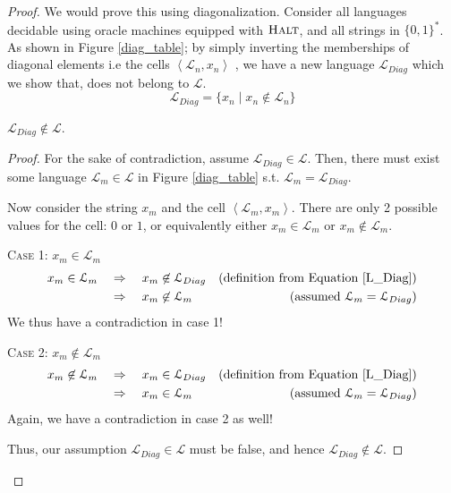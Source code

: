\documentclass[usletter]{article}
\newcommand {\langset}[1]      {\ensuremath{\mathcal{#1}}}
\newcommand {\namedlangset}[1] {\ensuremath{\textnormal{\textsc{#1}}}}
\newcommand {\langL}          {\langset{L}}
\begin{document}
\begin{enumerate}
\begin{proof}
    We would prove this using diagonalization. Consider all languages decidable
    using oracle machines equipped with \namedlangset{Halt}, and all strings in
    $\{0,1\}^*$. As shown in Figure \ref{diag_table}; by simply inverting the
    memberships of diagonal elements i.e the cells $\left< \langL_n,x_n \right>$
    , we have a new language $\langL_{Diag}$ which we show that, does not belong
    to \langL.
    \begin{equation}
      \label{L_Diag}
      \langL_{Diag} = \{ x_n \mid x_n \not\in \langL_n \}
    \end{equation}
    \begin{claim}
      $ \langL_{Diag} \not\in \langL $.
    \end{claim}
    \begin{proof}
      For the sake of contradiction, assume $\langL_{Diag} \in \langL$. Then,
      there must exist some language $\langL_m \in \langL$ in Figure
      \ref{diag_table} s.t. $\langL_m = \langL_{Diag}$.

      Now consider the string $x_m$ and the cell $\left< \langL_m, x_m \right>$.
      There are only 2 possible values for the cell: $0$ or $1$, or equivalently
      either $x_m \in \langL_m$ or $x_m \not\in \langL_m$.

      \textsc{Case 1: $x_m \in \langL_m$}
      \begin{align*}
        x_m \in \langL_m \quad &\Rightarrow \quad x_m \not\in \langL_{Diag}
            & (\textnormal{definition from Equation }\ref{L_Diag})\\
          &\Rightarrow \quad x_m \not\in \langL_m
            & (\textnormal{assumed }\langL_m = \langL_{Diag})
      \end{align*}
      We thus have a contradiction in case 1!

      \textsc{Case 2: $x_m \not\in \langL_m$}
      \begin{align*}
        x_m \not\in \langL_m \quad &\Rightarrow \quad x_m \in \langL_{Diag}
            & (\textnormal{definition from Equation }\ref{L_Diag})\\
          &\Rightarrow \quad x_m \in \langL_m
            & (\textnormal{assumed }\langL_m = \langL_{Diag})
      \end{align*}
      Again, we have a contradiction in case 2 as well!

      Thus, our assumption  $\langL_{Diag} \in \langL$ must be false, and hence
      $\langL_{Diag} \not\in \langL$.
    \end{proof}


\end{proof}
\end{enumerate}
\end{document}
